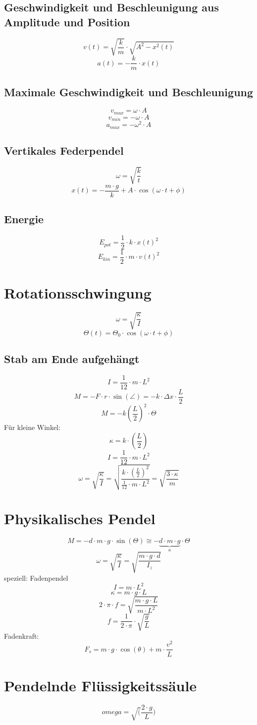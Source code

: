 \subsection{Geschwindigkeit und Beschleunigung aus Amplitude und Position}
\[ \boxed{v(t) = \sqrt{\frac{k}{m}} \cdot \sqrt{A^2 - x^2(t)}} \]
\[ \boxed{a(t) = - \frac{k}{m} \cdot x(t)} \]

\subsection{Maximale Geschwindigkeit und Beschleunigung}
\[ \boxed{v_{max} = \omega \cdot A} \]
\[ \boxed{v_{min} = -\omega \cdot A} \]
\[ \boxed{a_{max} = -\omega^2 \cdot A} \]

\subsection{Vertikales Federpendel}
\[ \boxed{\omega = \sqrt{\frac{k}{t}}} \]
\[ \boxed{x(t) = - \frac{m \cdot g}{k} + A \cdot \cos(\omega \cdot t + \phi)} \]

\subsection{Energie}
\[ \boxed{E_{pot} = \frac{1}{2} \cdot k \cdot x(t)^2} \]
\[ \boxed{E_{kin} = \frac{1}{2} \cdot m \cdot v(t)^2} \]

\section{Rotationsschwingung}
\[ \boxed{\omega = \sqrt{\frac{\kappa}{I}}} \]
\[ \boxed{\Theta(t) = \Theta_0 \cdot \cos(\omega \cdot t + \phi)} \]

\subsection{Stab am Ende aufgehängt}
\[ \boxed{I = \frac{1}{12} \cdot m \cdot L^2} \]
\[ \boxed{M = -F \cdot r \cdot \sin(\angle) = -k \cdot \Delta x \cdot \frac{L}{2}} \]
\[ \boxed{M = -k \left(\frac{L}{2}\right)^2 \cdot \Theta} \]
Für kleine Winkel: 
\[ \boxed{\kappa = k \cdot \left(\frac{L}{2}\right)} \]
\[ \boxed{I = \frac{1}{12} \cdot m \cdot L^2} \]
\[ \boxed{\omega = \sqrt{\frac{\kappa}{I}} 
= \sqrt{\frac{k \cdot \left(\frac{L}{2}\right)^2}{\frac{1}{12}\cdot m \cdot L^2}} 
= \sqrt{\frac{3 \cdot \kappa}{m}}} \]

\section{Physikalisches Pendel}
\[ \boxed{M = -d \cdot m \cdot g \cdot \sin(\Theta) 
\cong - \underbrace{d \cdot m \cdot g}_{\kappa} \cdot \Theta} \]
\[ \boxed{\omega = \sqrt{\frac{\kappa}{I}} 
= \sqrt{\frac{m \cdot g \cdot d}{I_z}}} \]
speziell: Fadenpendel
\[ \boxed{I = m \cdot L^2} \]
\[ \boxed{\kappa = m \cdot g \cdot L} \]
\[ \boxed{2 \cdot \pi \cdot f = \sqrt{\frac{m \cdot g \cdot L}{m \cdot L^2}}} \]
\[ \boxed{f = \frac{1}{2 \cdot \pi} \cdot \sqrt{\frac{g}{L}}} \]
Fadenkraft: 
\[ \boxed{F_s = m \cdot g \cdot \cos(\theta) + m \cdot \frac{v^2}{L}} \]

\section{Pendelnde Flüssigkeitssäule}
\[ \boxed{omega = \sqrt(\frac{2 \cdot g}{L})} \]